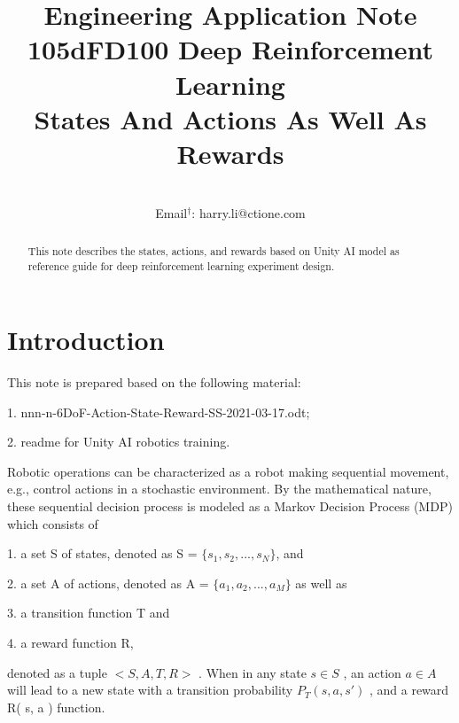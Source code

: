 \documentclass[conference]{IEEEtran}
\begin{document}
 

\title{{\small Engineering Application Note 105dFD100 Deep Reinforcement Learning} \\
States And Actions As Well As Rewards
}
 
\author{
 \\
Email$^{\dagger}$: harry.li@ctione.com\\
}

\maketitle
\begin{abstract}
This note describes the states, actions, and rewards
based on Unity AI model as reference guide for 
deep reinforcement learning experiment design.   
\end{abstract}

\IEEEpeerreviewmaketitle

\section{Introduction}

This note is prepared based on the following material: 

1. nnn-n-6DoF-Action-State-Reward-SS-2021-03-17.odt;

2. readme for Unity AI robotics training. 

Robotic operations can be characterized as a robot making
sequential movement, e.g., control actions in a stochastic 
environment. By the mathematical nature, these
sequential decision process is modeled as 
a Markov Decision Process (MDP) which consists of 

1. a set S of states, denoted as 
S = $\{s_1, s_2, ..., s_N \}$, 
and 

2. a set A of actions, denoted as 
A = $\{a_1, a_2, ..., a_M \}$ 
as well as  

3. a transition function
T and 

4. a reward function R, 

denoted as 
a tuple $< S, A, T, R >$ .
When in any state $s \in S$ , an action $a \in A$ 
will lead to a new state with a transition 
probability $P_T ( s, a, s\prime )$ , and 
a reward R( s, a ) function. 
\end{document}
